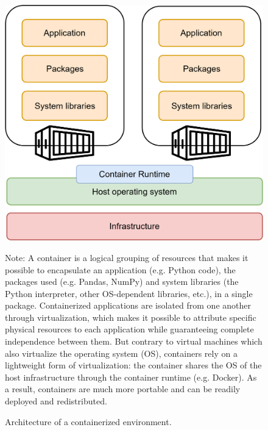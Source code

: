 \documentclass[graybox]{svmult}
\begin{document}
\begin{figure}[htbp]
    \begin{center}
        \includegraphics[width=0.65\linewidth]{figures/containers.png}
    \end{center}
    \caption{Architecture of a containerized environment.}
    \label{fig:containers}
    \medskip
    {\footnotesize Note: A container is a logical grouping of resources that makes it possible to encapsulate an application (e.g. Python code), the packages used (e.g. Pandas, NumPy) and system libraries (the Python interpreter, other OS-dependent libraries, etc.), in a single package. Containerized applications are isolated from one another through virtualization, which makes it possible to attribute specific physical resources to each application while guaranteeing complete independence between them. But contrary to virtual machines which also virtualize the operating system (OS), containers rely on a lightweight form of virtualization: the container shares the OS of the host infrastructure through the container runtime (e.g. Docker). As a result, containers are much more portable and can be readily deployed and redistributed.}
\end{figure}
\end{document}
